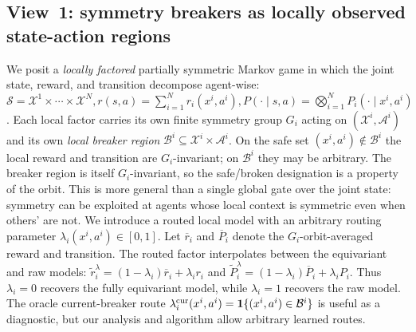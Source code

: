 \documentclass[11pt]{article}
\begin{document}
\subsection{View~1: symmetry breakers as locally observed state-action regions}
We posit a \emph{locally factored} partially symmetric Markov game in which the
joint state, reward, and transition decompose agent-wise:
$
\mathcal{S} = \mathcal{X}^1 \times \cdots \times \mathcal{X}^N,
r(s,a) = \sum_{i=1}^N r_i(x^i, a^i),
P(\cdot \mid s, a) = \bigotimes_{i=1}^N P_i(\cdot \mid x^i, a^i)
$.
Each local factor carries its own finite symmetry group $G_i$ acting on $(\mathcal{X}^i, \mathcal{A}^i)$ and its own \emph{local breaker region} $\mathcal{B}^i \subseteq \mathcal{X}^i \times \mathcal{A}^i$. On the safe set $(x^i, a^i) \notin \mathcal{B}^i$ the local reward and transition are $G_i$-invariant; on $\mathcal{B}^i$ they may be arbitrary. The breaker region is itself $G_i$-invariant, so the safe/broken designation is a property of the orbit. This is more general than a single global gate over the joint state: symmetry can be exploited at agents whose local context is symmetric even when others' are not.
We introduce a routed local model with an arbitrary routing parameter $\lambda_i(x^i,a^i) \in [0,1]$. Let $\overline r_i$ and $\overline P_i$ denote the $G_i$-orbit-averaged reward and transition. The routed factor interpolates between the equivariant and raw models: $\widetilde r_i^\lambda=(1-\lambda_i)\overline r_i+\lambda_i r_i$ and $\widetilde P_i^\lambda=(1-\lambda_i)\overline P_i+\lambda_i P_i$. Thus $\lambda_i=0$ recovers the fully equivariant model, while $\lambda_i=1$ recovers the raw model. The oracle current-breaker route $\lambda_i^{\rm cur}(x^i,a^i)=\mathbf{1}\{(x^i,a^i)\in\mathcal B^i\}$ is useful as a diagnostic, but our analysis and algorithm allow arbitrary learned routes.
\end{document}
